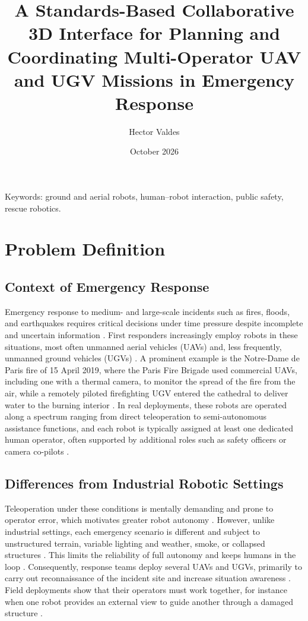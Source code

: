\documentclass{article}
\title{A Standards-Based Collaborative 3D Interface for Planning and Coordinating Multi-Operator UAV and UGV Missions in Emergency Response}
\author{Hector Valdes}
\date{October 2026}
\begin{document}
\maketitle

Keywords:
ground and aerial robots, human–robot interaction, public safety, rescue robotics.

\section{Problem Definition}

\subsection{Context of Emergency Response}
Emergency response to medium- and large-scale incidents such as fires, floods, and earthquakes requires critical decisions under time pressure despite incomplete and uncertain information \cite{kruijff2021}.
First responders increasingly employ robots in these situations, most often unmanned aerial vehicles (UAVs) and, less frequently, unmanned ground vehicles (UGVs) \cite{kruijff2021, delmerico2019}.
A prominent example is the Notre-Dame de Paris fire of 15 April 2019, where the Paris Fire Brigade used commercial UAVs, including one with a thermal camera, to monitor the spread of the fire from the air, while a remotely piloted firefighting UGV entered the cathedral to deliver water to the burning interior \cite{nardi2019, peskoeyang2019}.
In real deployments, these robots are operated along a spectrum ranging from direct teleoperation to semi-autonomous assistance functions, and each robot is typically assigned at least one dedicated human operator, often supported by additional roles such as safety officers or camera co-pilots \cite{surmann2024}.

\subsection{Differences from Industrial Robotic Settings}
Teleoperation under these conditions is mentally demanding and prone to operator error, which motivates greater robot autonomy \cite{kruijff2021}.
However, unlike industrial settings, each emergency scenario is different and subject to unstructured terrain, variable lighting and weather, smoke, or collapsed structures \cite{kruijff2021}.
This limits the reliability of full autonomy and keeps humans in the loop \cite{surmann2024, queralta2020}.
Consequently, response teams deploy several UAVs and UGVs, primarily to carry out reconnaissance of the incident site and increase situation awareness \cite{kruijff2021}.
Field deployments show that their operators must work together, for instance when one robot provides an external view to guide another through a damaged structure \cite{surmann2024}.
\end{document}

